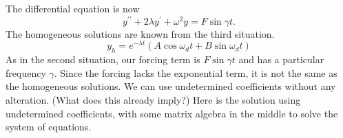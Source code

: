 \documentclass[fleqn,letterpaper]{report}
\begin{document}
The differential equation is now
\begin{equation*}
y^{\prime\prime} + 2\lambda y^\prime + \omega^2 y = F \sin
\gamma t.
\end{equation*}
The homogeneous solutions are known from the third situation.
\begin{equation*}
y_h = e^{-\lambda t} (A \cos \omega_d t + B \sin \omega_d t)
\end{equation*}
As in the second situation, our forcing term is $F\sin \gamma
t$ and has a particular frequency $\gamma$. Since the
forcing lacks the exponential term, it is not the same as the
homogeneous solutions. We can use undetermined coefficients
without any alteration. (What does this already imply?) Here
is the solution using undetermined coefficients, with some
matrix algebra in the middle to solve the system of
equations.
\end{document}

